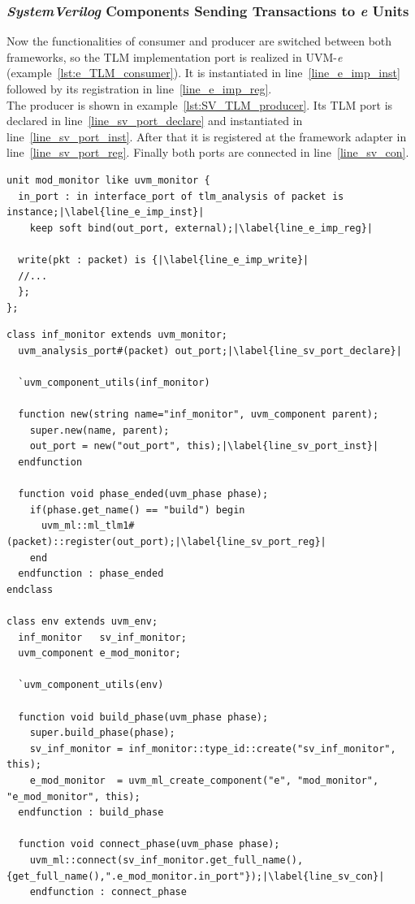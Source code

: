 \subsubsection{\emph{SystemVerilog} Components Sending Transactions to \textit{e} Units}
Now the functionalities of consumer and producer are switched between both frameworks, so the TLM implementation port is
realized in UVM-\textit{e} (example~\ref{lst:e_TLM_consumer}). It is instantiated in line~\ref{line_e_imp_inst} followed
by its registration in line~\ref{line_e_imp_reg}.\\
The producer is shown in example~\ref{lst:SV_TLM_producer}. Its TLM port is declared in line~\ref{line_sv_port_declare}
and instantiated in line~\ref{line_sv_port_inst}. After that it is registered at the framework adapter in
line~\ref{line_sv_port_reg}. Finally both ports are connected in line~\ref{line_sv_con}.
\lstset{language=e, numbers = left, escapechar=|, breaklines=true}
\begin{lstlisting}[frame=htrbl, caption={\textit{e}: consumer side of an TLM connection},
label={lst:e_TLM_consumer}]
unit mod_monitor like uvm_monitor {
  in_port : in interface_port of tlm_analysis of packet is instance;|\label{line_e_imp_inst}|
    keep soft bind(out_port, external);|\label{line_e_imp_reg}|
    
  write(pkt : packet) is {|\label{line_e_imp_write}|
  //...
  };
};
\end{lstlisting}

\lstset{language=SystemVerilog, numbers = left, escapechar=|, breaklines=true}
\begin{lstlisting}[frame=htrbl, caption={SystemVerilog: producer side of an TLM connection},
label={lst:SV_TLM_producer}]
class inf_monitor extends uvm_monitor;
  uvm_analysis_port#(packet) out_port;|\label{line_sv_port_declare}|
  
  `uvm_component_utils(inf_monitor)
  
  function new(string name="inf_monitor", uvm_component parent);
    super.new(name, parent);
    out_port = new("out_port", this);|\label{line_sv_port_inst}|
  endfunction 
  
  function void phase_ended(uvm_phase phase);
    if(phase.get_name() == "build") begin
      uvm_ml::ml_tlm1#(packet)::register(out_port);|\label{line_sv_port_reg}|
    end
  endfunction : phase_ended
endclass

class env extends uvm_env;
  inf_monitor   sv_inf_monitor;
  uvm_component e_mod_monitor;
  
  `uvm_component_utils(env)
  
  function void build_phase(uvm_phase phase);
    super.build_phase(phase);
    sv_inf_monitor = inf_monitor::type_id::create("sv_inf_monitor", this);
    e_mod_monitor  = uvm_ml_create_component("e", "mod_monitor", "e_mod_monitor", this); 
  endfunction : build_phase
  
  function void connect_phase(uvm_phase phase);
    uvm_ml::connect(sv_inf_monitor.get_full_name(), {get_full_name(),".e_mod_monitor.in_port"});|\label{line_sv_con}|
    endfunction : connect_phase
\end{lstlisting}

